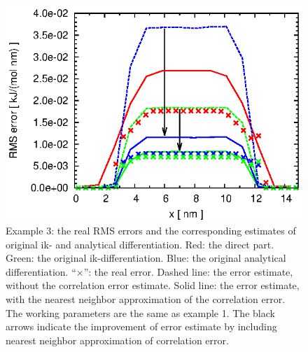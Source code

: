 \documentclass[aps,pre,preprint]{revtex4}
\begin{document}
\begin{figure}
  \centering
  \includegraphics[]{fig.new//fig.water.orig.error.eps}
  \caption{
    Example 3: the real RMS errors and the corresponding
    estimates of original ik- and analytical differentiation.
    Red: the direct part.
    Green: the original ik-differentiation.
    Blue: the original analytical differentiation.
    ``$\times$'': the real error.
    Dashed line: the error estimate, without the correlation error estimate.
    Solid  line: the error estimate, with the nearest neighbor
    approximation of the correlation error.
    The working parameters are the same as example 1.
    The black arrows indicate the improvement
    of error estimate by including nearest neighbor
    approximation of correlation error.
  }   
  \label{fig:water-error0}
\end{figure}
\end{document}

